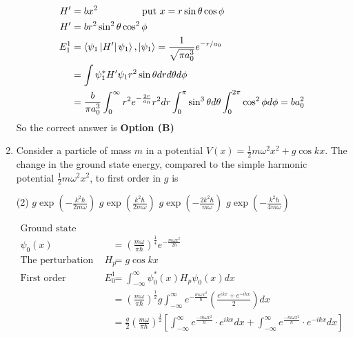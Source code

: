 \begin{enumerate}
\begin{tasks}
\end{tasks}
\begin{answer}
	$$
\begin{aligned}
H^{\prime}&=b x^{2} \hspace{1.5cm}\text{ put }x=r \sin \theta \cos \phi\\
H^{\prime}&=b r^{2} \sin ^{2} \theta \cos ^{2} \phi\\
E_{1}^{1}&=\left\langle\psi_{1}\left|H^{\prime}\right| \psi_{1}\right\rangle,\left|\psi_{1}\right\rangle=\frac{1}{\sqrt{\pi a_{0}^{3}}} e^{-r / a_{0}}\\
&=\int \psi_{1}^{*} H^{\prime} \psi_{1} r^{2} \sin \theta d r d \theta d \phi\\
&=\frac{b}{\pi a_{0}^{3}} \int_{0}^{\infty} r^{2} e^{-\frac{2 r}{a_{0}}} r^{2} d r \int_{0}^{\pi} \sin ^{3} \theta d \theta \int_{0}^{2 \pi} \cos ^{2} \phi d \phi=b a_{0}^{2}
\end{aligned}
$$
So the correct answer is \textbf{Option (B)}
\end{answer}
\item Consider a particle of mass $m$ in a potential $V(x)=\frac{1}{2} m \omega^{2} x^{2}+g \cos k x$. The change in the ground state energy, compared to the simple harmonic potential $\frac{1}{2} m \omega^{2} x^{2}$, to first order in $g$ is
{}
\begin{tasks}(2)
\task[\textbf{A.}] $g \exp \left(-\frac{k^{2} \hbar}{2 m \omega}\right)$
\task[\textbf{B.}] $g \exp \left(\frac{k^{2} \hbar}{2 m \omega}\right)$
\task[\textbf{C.}] $g \exp \left(-\frac{2 k^{2} \hbar}{m \omega}\right)$
\task[\textbf{D.}] $g \exp \left(-\frac{k^{2} \hbar}{4 m \omega}\right)$
\end{tasks}
\begin{answer}
	$$
\begin{aligned}
\text{Ground state wavefunction}\\
\psi_{0}(x)&=\left(\frac{m \omega}{\pi \hbar}\right)^{\frac{1}{4}} e^{-\frac{m \omega x^{2}}{2 \hbar}}\\
\text{The perturbation term is }H_{p}&=g \cos k x\\
\text{First order correction }E_{0}^{1}&=\int_{-\infty}^{\infty} \psi_{0}^{*}(x) H_{p} \psi_{0}(x) d x\\
&=\left(\frac{m \omega}{\pi \hbar}\right)^{\frac{1}{2}} g \int_{-\infty}^{\infty} e^{-\frac{m \omega x^{2}}{\hbar}}\left(\frac{e^{i k x}+e^{-i k x}}{2}\right) d x\\&=\frac{g}{2}\left(\frac{m \omega}{\pi \hbar}\right)^{\frac{1}{2}}\left[\int_{-\infty}^{\infty} e^{\frac{-m \omega x^{2}}{\hbar}} \cdot e^{i k x} d x+\int_{-\infty}^{\infty} e^{\frac{-m \omega x^{2}}{\hbar}} \cdot e^{-i k x} d x\right]\\

\end{aligned}$$
\end{answer}
\end{enumerate}
